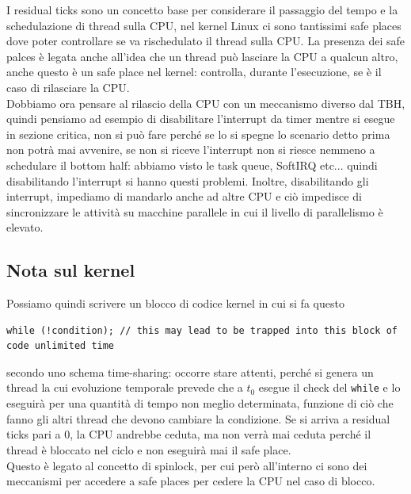 \documentclass[12pt, oneside]{extbook}
\begin{document}
I residual ticks sono un concetto base per considerare il passaggio del tempo e la schedulazione di thread sulla CPU, nel kernel Linux ci sono tantissimi safe places dove poter controllare se va rischedulato il thread sulla CPU. La presenza dei safe palces è legata anche all'idea che un thread può lasciare la CPU a qualcun altro, anche questo è un safe place nel kernel: controlla, durante l'esecuzione, se è il caso di rilasciare la CPU.\\Dobbiamo ora pensare al rilascio della CPU con un meccanismo diverso dal TBH, quindi pensiamo ad esempio di disabilitare l'interrupt da timer mentre si esegue in sezione critica, non si può fare perché se lo si spegne lo scenario detto prima non potrà mai avvenire, se non si riceve l'interrupt non si riesce nemmeno a schedulare il bottom half: abbiamo visto le task queue, SoftIRQ etc... quindi disabilitando l'interrupt si hanno questi problemi. Inoltre, disabilitando gli interrupt, impediamo di mandarlo anche ad altre CPU e ciò impedisce di sincronizzare le attività su macchine parallele in cui il livello di parallelismo è elevato.
\subsection{Nota sul kernel}
Possiamo quindi scrivere un blocco di codice kernel in cui si fa questo
\begin{lstlisting}
while (!condition);	// this may lead to be trapped into this block of code unlimited time
\end{lstlisting}
secondo uno schema time-sharing: occorre stare attenti, perché si genera un thread la cui evoluzione temporale prevede che a $t_0$ esegue il check del \texttt{while} e lo eseguirà per una quantità di tempo non meglio determinata, funzione di ciò che fanno gli altri thread che devono cambiare la condizione. Se si arriva a residual ticks pari a 0, la CPU andrebbe ceduta, ma non verrà mai ceduta perché il thread è bloccato nel ciclo e non eseguirà mai il safe place.\\Questo è legato al concetto di spinlock, per cui però all'interno ci sono dei meccanismi per accedere a safe places per cedere la CPU nel caso di blocco.
\end{document}
